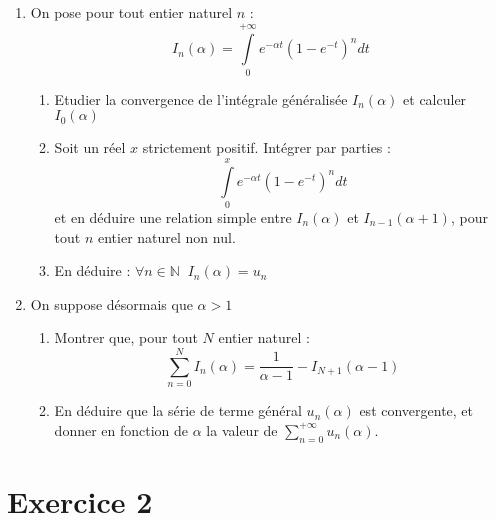 \documentclass[a4paper, 11pt,reqno]{article}
\begin{document}
\begin{enumerate}
\item On pose pour tout entier naturel $n$ : 
\begin{equation*}
I_{n}\left( \alpha \right) =\int\limits_{0}^{+\infty }e^{-\alpha t}\left(
1-e^{-t}\right) ^{n}dt
\end{equation*}

\begin{enumerate}
\item Etudier la convergence de l'intégrale généralisée $I_{n}\left( \alpha
\right) $ et calculer $I_{0}\left( \alpha \right) $

\item Soit un réel $x$ strictement positif. Intégrer par parties : 
\begin{equation*}
\int\limits_{0}^{x}e^{-\alpha t}\left( 1-e^{-t}\right) ^{n}dt
\end{equation*}%
et en déduire une relation simple entre $I_{n}\left( \alpha \right) $ et $%
I_{n-1}\left( \alpha +1\right) $, pour tout $n$ entier naturel non nul.

\item En déduire : $\forall n\in \mathbb{N\;\;}I_{n}\left( \alpha \right)
=u_{n}$
\end{enumerate}

\item On suppose désormais que $\alpha >1$

\begin{enumerate}
\item Montrer que, pour tout $N$ entier naturel : 
\begin{equation*}
\sum_{n=0}^{N}I_{n}\left( \alpha \right) =\dfrac{1}{\alpha -1}-I_{N+1}\left(
\alpha -1\right)
\end{equation*}

\item En déduire que la série de terme général $u_{n}\left( \alpha \right) $
est convergente, et donner en fonction de $\alpha $ la valeur de $%
\sum\limits_{n=0}^{+\infty }u_{n}\left( \alpha \right) $.
\end{enumerate}
\end{enumerate}

\section*{Exercice 2}
\end{document}
